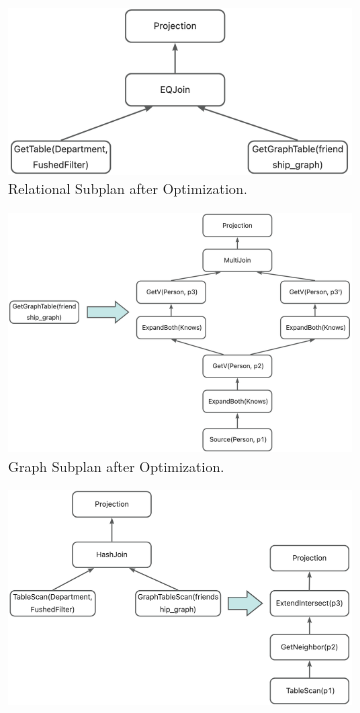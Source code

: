 \begin{figure}
\begin{subfigure}[b]{0.4\linewidth}
    \end{subfigure}
    \begin{subfigure}[b]{0.4\linewidth}
        \centering
        \includegraphics[width=\linewidth]{./figures/converged-logical-plan-relational-optimized.png}
        \caption{Relational Subplan after Optimization.}
        \label{fig:relational-plan-optimized}
    \end{subfigure}
    \begin{subfigure}[b]{0.4\linewidth}
        \centering
        \includegraphics[width=\linewidth]{./figures/converged-logical-plan-graph-optimized.png}
        \caption{Graph Subplan after Optimization.}
        \label{fig:graph-plan-optimized}
    \end{subfigure}
    \begin{subfigure}[b]{0.4\linewidth}
        \centering
        \includegraphics[width=\linewidth]{./figures/converged-physical-plan.png}

\end{subfigure}
\end{figure}
